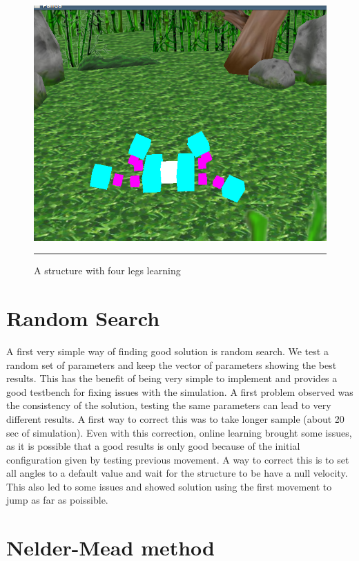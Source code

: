 \begin{figure}[htbp]
    \centering
    \includegraphics[scale=0.5]{Figures/four_legged.png}
    \rule{35em}{0.5pt}
    \caption[A structure with four legs learning]{A structure with four legs learning}
    \label{fig:four_legged}
\end{figure}

\section{Random Search}

A first very simple way of finding good solution is random search. We test a random set of parameters and keep the vector of parameters showing the best results. This has the benefit of being very simple to implement and provides a good testbench for fixing issues with the simulation. A first problem observed was the consistency of the solution, testing the same parameters can lead to very different results. A first way to correct this was to take longer sample (about 20 sec of simulation). Even with this correction, online learning brought some issues, as it is possible that a good results is only good because of the initial configuration given by testing previous movement. A way to correct this is to set all angles to a default value and wait for the structure to be have a null velocity. This also led to some issues and showed solution using the first movement to jump as far as poissible. 

\section{Nelder-Mead method}

